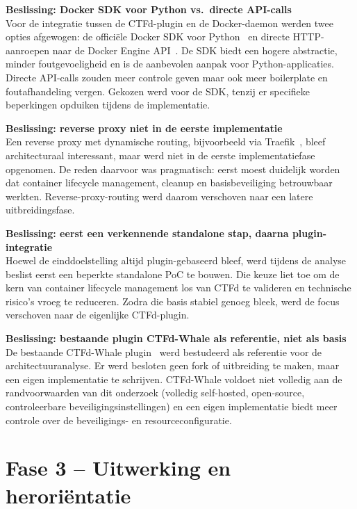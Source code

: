 \documentclass[dutch,dit,thesis]{hogentreport}
\begin{document}
\textbf{Beslissing: Docker SDK voor Python vs.\ directe API-calls}\\
Voor de integratie tussen de CTFd-plugin en de Docker-daemon werden twee opties afgewogen: de officiële Docker SDK voor Python~\autocite{DockerSDKPython} en directe HTTP-aanroepen naar de Docker Engine API~\autocite{DockerEngineAPI}. De SDK biedt een hogere abstractie, minder foutgevoeligheid en is de aanbevolen aanpak voor Python-applicaties. Directe API-calls zouden meer controle geven maar ook meer boilerplate en foutafhandeling vergen. Gekozen werd voor de SDK, tenzij er specifieke beperkingen opduiken tijdens de implementatie.

\textbf{Beslissing: reverse proxy niet in de eerste implementatie}\\
Een reverse proxy met dynamische routing, bijvoorbeeld via Traefik~\autocite{Traefik}, bleef architecturaal interessant, maar werd niet in de eerste implementatiefase opgenomen. De reden daarvoor was pragmatisch: eerst moest duidelijk worden dat container lifecycle management, cleanup en basisbeveiliging betrouwbaar werkten. Reverse-proxy-routing werd daarom verschoven naar een latere uitbreidingsfase.

\textbf{Beslissing: eerst een verkennende standalone stap, daarna plugin-integratie}\\
Hoewel de einddoelstelling altijd plugin-gebaseerd bleef, werd tijdens de analyse beslist eerst een beperkte standalone PoC te bouwen. Die keuze liet toe om de kern van container lifecycle management los van CTFd te valideren en technische risico's vroeg te reduceren. Zodra die basis stabiel genoeg bleek, werd de focus verschoven naar de eigenlijke CTFd-plugin.

\textbf{Beslissing: bestaande plugin CTFd-Whale als referentie, niet als basis}\\
De bestaande CTFd-Whale plugin~\autocite{CTFdWhale} werd bestudeerd als referentie voor de architectuuranalyse. Er werd besloten geen fork of uitbreiding te maken, maar een eigen implementatie te schrijven. CTFd-Whale voldoet niet volledig aan de randvoorwaarden van dit onderzoek (volledig self-hosted, open-source, controleerbare beveiligingsinstellingen) en een eigen implementatie biedt meer controle over de beveiligings- en resourceconfiguratie.

\section*{Fase 3 -- Uitwerking en herori\"entatie}
\end{document}
